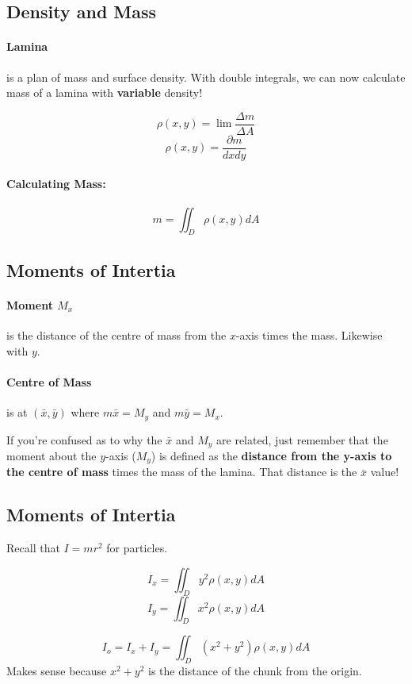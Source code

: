 \documentclass[a4paper,12pt]{report}
\begin{document}
\subsection{Density and Mass}
\paragraph{Lamina } is a plan of mass and surface density. With double integrals, 
we can now calculate mass of a lamina with \textbf{variable} density!

$$\rho(x, y) = \lim \frac{\Delta m}{\Delta A}$$
$$\rho(x, y) = \frac{\partial m}{dx dy}$$

\paragraph{Calculating Mass: }
$$m = \iint_D \rho(x, y) dA$$

\subsection{Moments of Intertia}

\paragraph{Moment $M_x$} is the distance of the centre of mass from the $x$-axis times 
the mass. Likewise with $y$.

\paragraph{Centre of Mass } is at $(\bar{x}, \bar{y})$ where $m\bar{x} = M_y$ and 
$m\bar{y} = M_x$.

If you're confused as to why the $\bar{x}$ and $M_y$ are related, just remember that 
the moment about the $y$-axis ($M_y$) is defined as the \textbf{distance from the 
y-axis to the centre of mass} times the mass of the lamina. That distance is the $\bar{x}$ 
value!

\subsection{Moments of Intertia}

Recall that $I = mr^2$ for particles.

$$I_x = \iint_D y^2 \rho(x, y)dA$$
$$I_y = \iint_D x^2 \rho(x, y)dA$$

$$I_o = I_x + I_y = \iint_D (x^2 + y^2) \rho(x, y)dA$$
Makes sense because $x^2+y^2$ is the distance of the chunk from the 
origin. 
\end{document}
